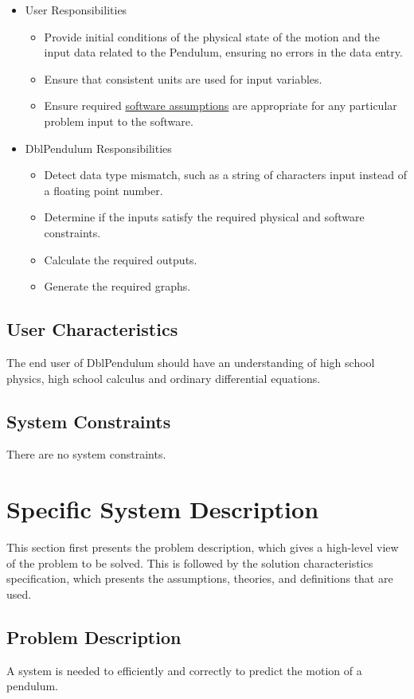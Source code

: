 \documentclass[12pt]{article}
\begin{document}
\begin{itemize}
\item{User Responsibilities}
\begin{itemize}
\item{Provide initial conditions of the physical state of the motion and the input data related to the Pendulum, ensuring no errors in the data entry.}
\item{Ensure that consistent units are used for input variables.}
\item{Ensure required \hyperref[Sec:Assumps]{software assumptions} are appropriate for any particular problem input to the software.}
\end{itemize}
\item{DblPendulum Responsibilities}
\begin{itemize}
\item{Detect data type mismatch, such as a string of characters input instead of a floating point number.}
\item{Determine if the inputs satisfy the required physical and software constraints.}
\item{Calculate the required outputs.}
\item{Generate the required graphs.}
\end{itemize}
\end{itemize}
\subsection{User Characteristics}
\label{Sec:UserChars}
The end user of DblPendulum should have an understanding of high school physics, high school calculus and ordinary differential equations.

\subsection{System Constraints}
\label{Sec:SysConstraints}
There are no system constraints.

\section{Specific System Description}
\label{Sec:SpecSystDesc}
This section first presents the problem description, which gives a high-level view of the problem to be solved. This is followed by the solution characteristics specification, which presents the assumptions, theories, and definitions that are used.

\subsection{Problem Description}
\label{Sec:ProbDesc}
A system is needed to efficiently and correctly to predict the motion of a pendulum.
\end{document}

